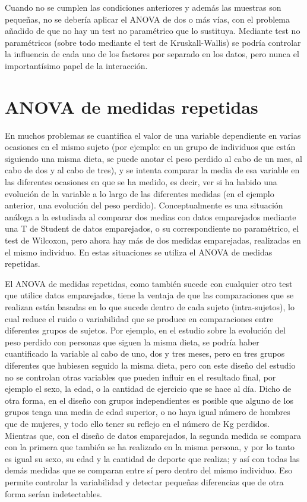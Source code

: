 \documentclass[
  a4paper,
]{scrreport}
\theoremstyle{plain}
\theoremstyle{definition}
\theoremstyle{definition}
\theoremstyle{remark}
\begin{document}
Cuando no se cumplen las condiciones anteriores y además las muestras
son pequeñas, no se debería aplicar el ANOVA de dos o más vías, con el
problema añadido de que no hay un test no paramétrico que lo sustituya.
Mediante test no paramétricos (sobre todo mediante el test de
Kruskall-Wallis) se podría controlar la influencia de cada uno de los
factores por separado en los datos, pero nunca el importantísimo papel
de la interacción.

\section{ANOVA de medidas repetidas}\label{anova-de-medidas-repetidas}

En muchos problemas se cuantifica el valor de una variable dependiente
en varias ocasiones en el mismo sujeto (por ejemplo: en un grupo de
individuos que están siguiendo una misma dieta, se puede anotar el peso
perdido al cabo de un mes, al cabo de dos y al cabo de tres), y se
intenta comparar la media de esa variable en las diferentes ocasiones en
que se ha medido, es decir, ver si ha habido una evolución de la
variable a lo largo de las diferentes medidas (en el ejemplo anterior,
una evolución del peso perdido). Conceptualmente es una situación
análoga a la estudiada al comparar dos medias con datos emparejados
mediante una T de Student de datos emparejados, o su correspondiente no
paramétrico, el test de Wilcoxon, pero ahora hay más de dos medidas
emparejadas, realizadas en el mismo individuo. En estas situaciones se
utiliza el ANOVA de medidas repetidas.

El ANOVA de medidas repetidas, como también sucede con cualquier otro
test que utilice datos emparejados, tiene la ventaja de que las
comparaciones que se realizan están basadas en lo que sucede dentro de
cada sujeto (intra-sujetos), lo cual reduce el ruido o variabilidad que
se produce en comparaciones entre diferentes grupos de sujetos. Por
ejemplo, en el estudio sobre la evolución del peso perdido con personas
que siguen la misma dieta, se podría haber cuantificado la variable al
cabo de uno, dos y tres meses, pero en tres grupos diferentes que
hubiesen seguido la misma dieta, pero con este diseño del estudio no se
controlan otras variables que pueden influir en el resultado final, por
ejemplo el sexo, la edad, o la cantidad de ejercicio que se hace al día.
Dicho de otra forma, en el diseño con grupos independientes es posible
que alguno de los grupos tenga una media de edad superior, o no haya
igual número de hombres que de mujeres, y todo ello tener su reflejo en
el número de Kg perdidos. Mientras que, con el diseño de datos
emparejados, la segunda medida se compara con la primera que también se
ha realizado en la misma persona, y por lo tanto es igual su sexo, su
edad y la cantidad de deporte que realiza; y así con todas las demás
medidas que se comparan entre sí pero dentro del mismo individuo. Eso
permite controlar la variabilidad y detectar pequeñas diferencias que de
otra forma serían indetectables.
\end{document}
